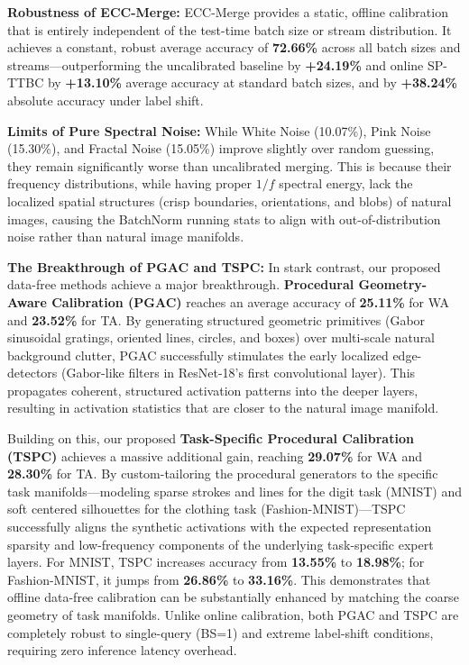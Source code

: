 \documentclass{article}
\theoremstyle{plain}
\theoremstyle{definition}
\theoremstyle{remark}
\begin{document}
\textbf{Robustness of ECC-Merge:}
ECC-Merge provides a static, offline calibration that is entirely independent of the test-time batch size or stream distribution. It achieves a constant, robust average accuracy of \textbf{72.66\%} across all batch sizes and streams—outperforming the uncalibrated baseline by \textbf{+24.19\%} and online SP-TTBC by \textbf{+13.10\%} average accuracy at standard batch sizes, and by \textbf{+38.24\%} absolute accuracy under label shift.

\textbf{Limits of Pure Spectral Noise:}
While White Noise (10.07\%), Pink Noise (15.30\%), and Fractal Noise (15.05\%) improve slightly over random guessing, they remain significantly worse than uncalibrated merging. This is because their frequency distributions, while having proper $1/f$ spectral energy, lack the localized spatial structures (crisp boundaries, orientations, and blobs) of natural images, causing the BatchNorm running stats to align with out-of-distribution noise rather than natural image manifolds.

\textbf{The Breakthrough of PGAC and TSPC:}
In stark contrast, our proposed data-free methods achieve a major breakthrough. \textbf{Procedural Geometry-Aware Calibration (PGAC)} reaches an average accuracy of \textbf{25.11\%} for WA and \textbf{23.52\%} for TA. By generating structured geometric primitives (Gabor sinusoidal gratings, oriented lines, circles, and boxes) over multi-scale natural background clutter, PGAC successfully stimulates the early localized edge-detectors (Gabor-like filters in ResNet-18's first convolutional layer). This propagates coherent, structured activation patterns into the deeper layers, resulting in activation statistics that are closer to the natural image manifold.

Building on this, our proposed \textbf{Task-Specific Procedural Calibration (TSPC)} achieves a massive additional gain, reaching \textbf{29.07\%} for WA and \textbf{28.30\%} for TA. By custom-tailoring the procedural generators to the specific task manifolds—modeling sparse strokes and lines for the digit task (MNIST) and soft centered silhouettes for the clothing task (Fashion-MNIST)—TSPC successfully aligns the synthetic activations with the expected representation sparsity and low-frequency components of the underlying task-specific expert layers. For MNIST, TSPC increases accuracy from \textbf{13.55\%} to \textbf{18.98\%}; for Fashion-MNIST, it jumps from \textbf{26.86\%} to \textbf{33.16\%}. This demonstrates that offline data-free calibration can be substantially enhanced by matching the coarse geometry of task manifolds. Unlike online calibration, both PGAC and TSPC are completely robust to single-query (BS=1) and extreme label-shift conditions, requiring zero inference latency overhead.
\end{document}
